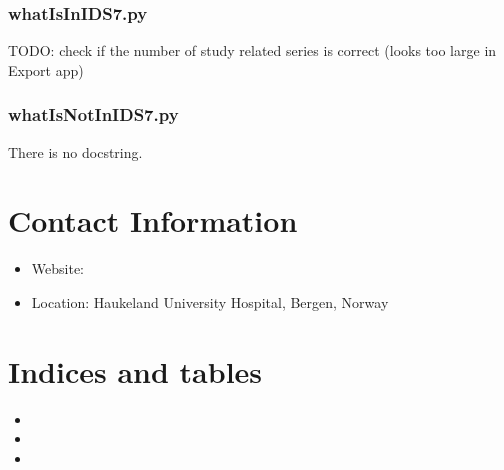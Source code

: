 \documentclass[letterpaper,10pt,english]{sphinxmanual}
\begin{document}
\sphinxstepscope


\subsection{whatIsInIDS7.py}
\label{\detokenize{Architecture/scripts/whatIsInIDS7:whatisinids7-py}}\label{\detokenize{Architecture/scripts/whatIsInIDS7::doc}}
\sphinxAtStartPar
TODO: check if the number of study related series is correct (looks too large in Export app)

\sphinxstepscope


\subsection{whatIsNotInIDS7.py}
\label{\detokenize{Architecture/scripts/whatIsNotInIDS7:whatisnotinids7-py}}\label{\detokenize{Architecture/scripts/whatIsNotInIDS7::doc}}
\sphinxAtStartPar
There is no docstring.


\chapter{Contact Information}
\label{\detokenize{index:contact-information}}\begin{itemize}
\item {} 
\sphinxAtStartPar
Website: 

\item {} 
\sphinxAtStartPar
Location: Haukeland University Hospital, Bergen, Norway

\end{itemize}


\chapter{Indices and tables}
\label{\detokenize{index:indices-and-tables}}\begin{itemize}
\item {} 
\sphinxAtStartPar
{}

\item {} 
\sphinxAtStartPar
{}

\item {} 
\sphinxAtStartPar
{}

\end{itemize}



\renewcommand{\indexname}{Index}
\printindex
\end{document}

